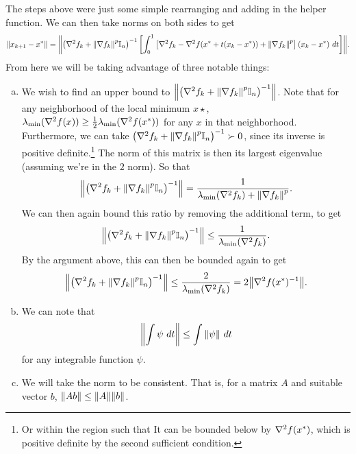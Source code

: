 \begin{solution}
    The steps above were just some simple rearranging and adding in the helper function. We can then take norms on both sides to get
    \begin{align}
        \norm{x_{k+1} - x^{*}} = \norm{\left ( \nabla^2f_k + \norm{\nabla f_k}^p \mathbb{I}_n\right)^{-1}\left[ \int_0^1 \left[ \nabla^2 f_k - \nabla^2f(x^{*} + t(x_k - x^{*})) + \norm{\nabla f_k}^p\right](x_k - x^{*}) \ dt\right]}.\label{p1:star}
    \end{align}
    From here we will be taking advantage of three notable things:
    \begin{enumerate}[(a)]
        \item We wish to find an upper bound to $\norm{\left ( \nabla^2f_k + \norm{\nabla f_k}^p \mathbb{I}_n\right)^{-1}}$. Note that for any neighborhood of the local minimum $x\star$, $\mathrm{\lambda}_{\min}(\nabla^2f(x)) \geq \frac{1}{2} \mathrm{\lambda}_{\min}(\nabla^2f(x^{*}))$ for any $x$ in that neighborhood. Furthermore, we can take $\left( \nabla^2f_k + \norm{\nabla f_k}^p \mathbb{I}_n\right)^{-1} \succ 0$, since its inverse is positive definite.\footnote{Or within the region such that It can be bounded below by $\nabla^2f(x^{*})$, which is positive definite by the second sufficient condition.} The norm of this matrix is then its largest eigenvalue (assuming we're in the $2$ norm). So that
        \[\norm{\left( \nabla^2f_k + \norm{\nabla f_k}^p \mathbb{I}_n\right)^{-1}} = \frac{1}{\mathrm{\lambda}_{\min}(\nabla^2f_k) + \norm{\nabla f_k}^p}.\]
        We can then again bound this ratio by removing the additional term, to get 
        \[\norm{\left( \nabla^2f_k + \norm{\nabla f_k}^p \mathbb{I}_n\right)^{-1}} \leq \frac{1}{\mathrm{\lambda}_{\min}(\nabla^2 f_k)}.\]
        By the argument above, this can then be bounded again to get
        \[\norm{\left( \nabla^2f_k + \norm{\nabla f_k}^p \mathbb{I}_n\right)^{-1}} \leq \frac{2}{\mathrm{\lambda}_{\min}(\nabla^2f_k)} = 2\norm{\nabla^2f(x^{*})^{-1}}.\]
        \item We can note that 
        \[\norm{\int \psi \ dt} \leq \int \norm{\psi} \ dt\]
        for any integrable function $\psi$. 
        \item We will take the norm to be consistent. That is, for a matrix $A$ and suitable vector $b$, $\norm{Ab} \leq \norm{A}\norm{b}$.
    \end{enumerate}
    

\end{solution}
